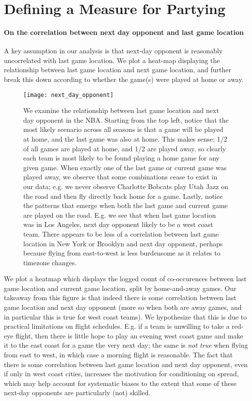 \documentclass[letterpaper,12pt]{article}
\begin{document}
\section{Defining a Measure for Partying}

\paragraph{On the correlation between next day opponent and last game location}
A key assumption in our analysis is that next-day opponent is reasonably uncorrelated with
last game location. We plot a heat-map displaying the relationship between last game location
and next game location, and further break this down according to whether the game(s)
were played at home or away.

\begin{figure}
  \centering
  \label{fig: next day opponent}
  \texttt{[image: next\_day\_opponent]}
  \caption{We examine the relationship between last game location and next day opponent in the NBA. Starting from the top left, notice that the most likely scenario across all seasons is that a game will be played at home, and the last game was also at home. This makes sense; 1/2 of all games are played at home, and 1/2 are played away, so clearly each team is most likely to be found playing a home game for any given game. When exactly one of the last game or current game was played away,
we observe that some combinations cease to exist in our data; e.g. we never observe Charlotte Bobcats play Utah Jazz on the road and then fly directly back home for a game. Lastly, notice the patterns that emerge when both the last game and current game are played on the road. E.g. we see that when last game location was in Los Angeles, next day opponent likely to be a west coast team. There appears to be less of a correlation between last game location in New York or Brooklyn and next day opponent, perhaps because flying from east-to-west
is less burdensome as it relates to timezone changes.} 
\end{figure}

We plot a heatmap which displays the logged count of co-occurences between last game
location and current game location, split by home-and-away games.
Our takeaway from this figure is that indeed there is some correlation between last game location
and next day opponent (more so when both are away games,  
and in particular this is true for west coast teams). We hypothesize that
this is due to practical limitations on flight schedules. E.g. if a team is unwilling to take a red-eye
flight, then there is little hope to play an evening west coast game and make it to the east coast for a game the very next day;
the same is \emph{not true} when flying from east to west, in which case a morning flight is reasonable.
The fact that there is some correlation between last game location and next day opponent, even if only in west coast cities, increases the motivation for conditioning on spread, which may help account for systematic biases to the extent that some of these next-day opponents are particularly (not) skilled. 
\end{document}
